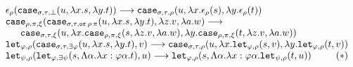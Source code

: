 \documentclass[a4paper,UKenglish,cleveref,autoref,numberwithinsect]{lipics-v2019}
\theoremstyle{definition}
\newcommand{\abs}[2]{\lambda #1.#2}
\newcommand{\tabs}[2]{\Lambda #1.#2}
\newcommand{\red}{\longrightarrow}
\begin{document}
\[
\begin{array}{l}
\epsilon_\rho(\mathtt{case}_{\sigma,\tau,\bot}(u,\abs{x}{s},
  \abs{y}{t})) \red
  \mathtt{case}_{\sigma,\tau,\rho}(u,\abs{x}{\epsilon_\rho(s)},
  \abs{y}{\epsilon_\rho(t)}) \\
\mathtt{case}_{\rho,\pi,\xi}(\mathtt{case}_{\sigma,\tau,\mathtt{or}\,
  \rho\,\pi}(u,\abs{x}{s},\abs{y}{t}),\abs{z}{v},
  \abs{a}{w}) \red \\
  \phantom{AB}
  \mathtt{case}_{\sigma,\tau,\xi}(u,\abs{x}{\mathtt{case}_{
  \rho,\pi,\xi}(s,\abs{z}{v},\abs{a}{w})},
  \abs{y}{\mathtt{case}_{\rho,\pi,\xi}(t,\abs{z}{v},
  \abs{a}{w})}) \\
\mathtt{let}_{\varphi,\rho}(
  \mathtt{case}_{\sigma,\tau,\exists\varphi}(
  u,\abs{x}{s},\abs{y}{t}),v) \red
  \mathtt{case}_{\sigma,\tau,\rho}(u,
  \abs{x}{\mathtt{let}_{\varphi,\rho}(s,v)},
  \abs{y}{\mathtt{let}_{\varphi,\rho}(t,v)}) \\
\mathtt{let}_{\psi,\rho}(\mathtt{let}_{\varphi,\exists\psi}(s,
  \tabs{\alpha}{\abs{x:\varphi\alpha}{t}}),u) \red
  \mathtt{let}_{\varphi,\rho}(s,\tabs{\alpha}{\abs{x:
  \varphi\alpha}{\mathtt{let}_{\psi,\rho}(t,u)}})
  \hfill (*) \\
\end{array}
\]
\end{document}
